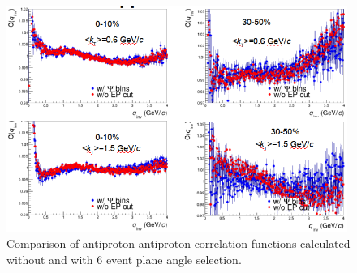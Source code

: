 \begin{figure}%
  \centering
  \includegraphics[width=0.99\textwidth]{apappsi}
  \caption{Comparison of antiproton-antiproton correlation functions calculated without and with 6 event plane angle selection.}
  \label{apappsi}
\end{figure}

